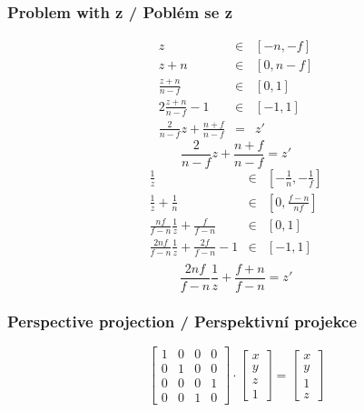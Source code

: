 \begin{frame}
\frametitle{Problem with z / Poblém se z}
\begin{multicols}{2}
{\tiny
\begin{eqnarray*}
	z &\in& [-n,-f] \\
	z+n &\in& [0,n-f] \\
	\frac{z+n}{n-f} &\in& [0,1] \\
	2\frac{z+n}{n-f}-1 &\in& [-1,1] \\
	\frac{2}{n-f}z+\frac{n+f}{n-f} &=& z'
\end{eqnarray*}
\begin{equation}
\label{eq:linz}
\frac{2}{n-f}z+\frac{n+f}{n-f} = z'
\end{equation}
}
\vfill
{\tiny
\begin{eqnarray*}
	\frac{1}{z} &\in& [-\frac{1}{n},-\frac{1}{f}] \\
	\frac{1}{z}+\frac{1}{n} &\in& [0,\frac{f-n}{nf}] \\
	\frac{nf}{f-n}\frac{1}{z}+\frac{f}{f-n} &\in& [0,1] \\
	\frac{2nf}{f-n}\frac{1}{z}+\frac{2f}{f-n}-1 &\in& [-1,1] \\
\end{eqnarray*}
\begin{equation}
\label{eq:persz}
\frac{2nf}{f-n}\frac{1}{z}+\frac{f+n}{f-n} = z'
\end{equation}
}
\end{multicols}

\end{frame}

\begin{frame}
\frametitle{Perspective projection / Perspektivní projekce}
{\tiny
\begin{equation}
\label{eq:swap}
\left[
\begin{array}{cccc} 
1 & 0 & 0 & 0 \\
0 & 1 & 0 & 0 \\
0 & 0 & 0 & 1 \\
0 & 0 & 1 & 0
\end{array}
\right]
\cdot
\left[
\begin{array}{c}
x \\
y \\
z \\
1
\end{array}
\right]
=
\left[
\begin{array}{c} 
x \\
y \\
1 \\
z
\end{array}
\right]
\end{equation}
}
\end{frame}

